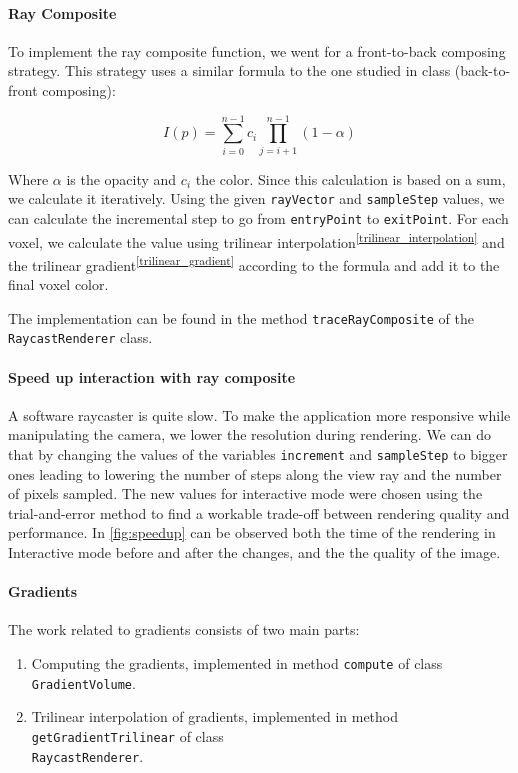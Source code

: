 \documentclass[a4paper]{article}
\begin{document}
\paragraph{Ray Composite}
\label{ray_composite}

To implement the ray composite function, we went for a front-to-back composing strategy. This strategy uses a similar formula to the one studied in class (back-to-front composing):

$$I(p)=\sum^{n-1}_{i=0}c_i\prod^{n-1}_{j=i+1}(1-\alpha)$$

Where $\alpha$ is the opacity and $c_i$ the color. Since this calculation is based on a sum, we calculate it iteratively. Using the given {\tt rayVector} and {\tt sampleStep} values, we can calculate the incremental step to go from {\tt entryPoint} to {\tt exitPoint}. For each voxel, we calculate the value using trilinear interpolation\textsuperscript{\autoref{trilinear_interpolation}} and the trilinear gradient\textsuperscript{\autoref{trilinear_gradient}} according to the formula and add it to the final voxel color.

The implementation can be found in the method {\tt traceRayComposite} of the {\tt RaycastRenderer} class.

\paragraph{Speed up interaction with ray composite}
\label{speed_up}

A software raycaster is quite slow. To make the application more responsive while manipulating the camera, we lower the resolution during rendering. We can do that by changing the values of the variables {\tt increment} and {\tt sampleStep} to bigger ones leading to lowering the number of steps along the view ray and the number of pixels sampled.  The new values for interactive mode were chosen using the trial-and-error method to find a workable trade-off between rendering quality and performance. In \autoref{fig:speedup} can be observed both the time of the rendering in Interactive mode before and after the changes, and the the quality of the image.

\paragraph{Gradients}
\label{subsec:gradients}

The work related to gradients consists of two main parts:

\begin{enumerate}[noitemsep]
  \item Computing the gradients, implemented in method {\tt compute} of class {\tt GradientVolume}.
  \item Trilinear interpolation of gradients, implemented in method {\tt getGradientTrilinear} of class\\ {\tt RaycastRenderer}.
\end{enumerate}
\end{document}
